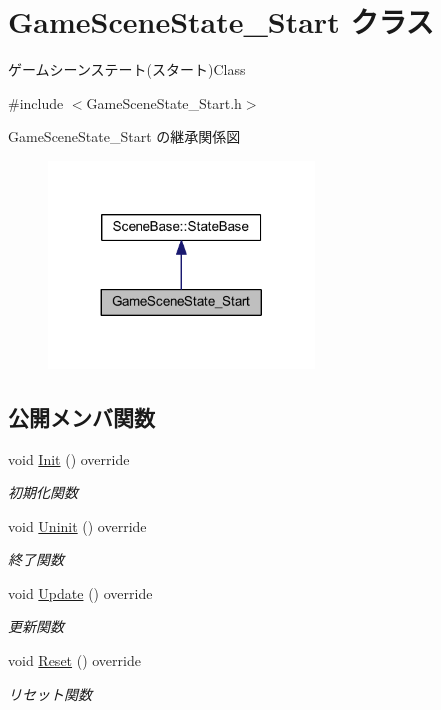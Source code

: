 \hypertarget{class_game_scene_state___start}{}\section{Game\+Scene\+State\+\_\+\+Start クラス}
\label{class_game_scene_state___start}


ゲームシーンステート(スタート)Class  




{\ttfamily \#include $<$Game\+Scene\+State\+\_\+\+Start.\+h$>$}



Game\+Scene\+State\+\_\+\+Start の継承関係図\nopagebreak
\begin{figure}[H]
\begin{center}
\leavevmode
\includegraphics[width=200pt]{class_game_scene_state___start__inherit__graph}
\end{center}
\end{figure}
\subsection*{公開メンバ関数}
\begin{DoxyCompactItemize}
\item 
void \mbox{\hyperlink{class_game_scene_state___start_ae921c57f349fbb2f00a197d40a3404b7}{Init}} () override
\begin{DoxyCompactList}\small\item\em 初期化関数 \end{DoxyCompactList}\item 
void \mbox{\hyperlink{class_game_scene_state___start_a636df8b7ac0173b044b0efc2927fb83b}{Uninit}} () override
\begin{DoxyCompactList}\small\item\em 終了関数 \end{DoxyCompactList}\item 
void \mbox{\hyperlink{class_game_scene_state___start_ae11bb8d8ea9eae4fea2a9acf33dd1c8b}{Update}} () override
\begin{DoxyCompactList}\small\item\em 更新関数 \end{DoxyCompactList}\item 
void \mbox{\hyperlink{class_game_scene_state___start_a59270f7b65613f580864ed8ea3056179}{Reset}} () override
\begin{DoxyCompactList}\small\item\em リセット関数 \end{DoxyCompactList}\end{DoxyCompactItemize}
